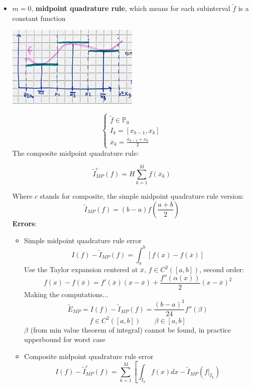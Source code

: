 \begin{itemize}
    \item $m=0$, \textbf{midpoint quadrature rule}, which means for each subinterval $\tilde{f}$ is a constant function
    \begin{center}
        \includegraphics[width=0.5\textwidth]{images/quadrature_m0.png}
    \end{center}
    $$
    \begin{cases}
        \tilde{f}\in\mathbb{P}_0\\
        I_k=[x_{k-1},x_k]\\        
        \overline{x}_k=\frac{x_{k-1}+x_k}{2}
    \end{cases}
    $$
    The composite midpoint quadrature rule:
    \begin{LARGE}
        $$
        \tilde{I}_{MP}^c(f)=H\sum_{k=1}^Mf(\overline{x}_k)
        $$
    \end{LARGE}
    Where $c$ stands for composite, the simple midpoint quadrature rule version:
    $$
    \tilde{I}_{MP}(f)=(b-a)f\left(\frac{a+b}{2}\right)
    $$
    \textbf{Errors}:
    \begin{itemize}
        \item Simple midpoint quadrature rule error
        $$
        I(f)-\tilde{I}_{MP}(f)=\int_a^b\left[f(x)-f(\overline{x})\right]
        $$
        Use the Taylor expansion centered at $\overline{x}$, $f\in C^2([a,b])$, second order:
        $$
        f(x)-f(\overline{x})=f'(\overline{x})(x-\overline{x})+
        \frac{f''(\alpha(x))}{2}(x-\overline{x})^2
        $$
        Making the computations...
        $$
        \tilde{E}_{MP}=I(f)-\tilde{I}_{MP}(f)=
        \frac{(b-a)^3}{24}f''(\beta)
        $$
        $$
        f\in C^2([a,b])\qquad\beta\in[a,b]
        $$
        $\beta$ (from min value theorem of integral) cannot be found, in practice upperbound for worst case
        \item Composite midpoint quadrature rule error
        $$
        I(f)-\tilde{I}_{MP}^c(f)=\sum_{k=1}^M\left[
            \int_{I_k}f(x)dx-
            \tilde{I}_{MP}\left(f\big|_{I_k}\right)
$$
\end{itemize}
\end{itemize}
